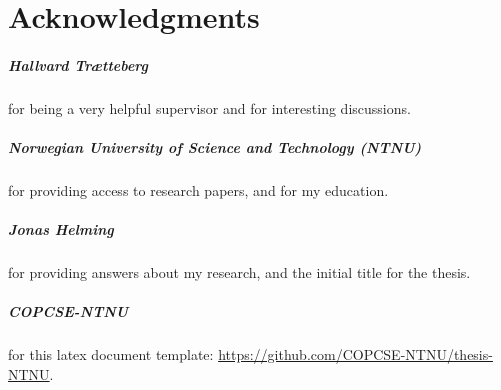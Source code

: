 \cleardoublepage{} %
\chapter*{Acknowledgments}

\paragraph*{Hallvard Trætteberg} for being a very helpful supervisor
and for interesting discussions.

\paragraph*{Norwegian University of Science and Technology (NTNU)} for providing access to research papers, and for my education. 

\paragraph*{Jonas Helming} for providing answers about my research, and the initial title for the thesis.


\paragraph*{COPCSE-NTNU} for this latex document template: \href{https://github.com/COPCSE-NTNU/thesis-NTNU}{https://github.com/COPCSE-NTNU/thesis-NTNU}.



